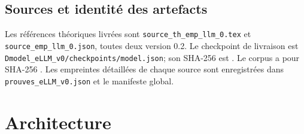 \documentclass[11pt,a4paper]{article}
\begin{document}
\subsection{Sources et identité des artefacts}
Les références théoriques livrées sont \texttt{source\_th\_emp\_llm\_0.tex} et \texttt{source\_emp\_llm\_0.json}, toutes deux version 0.2. Le checkpoint de livraison est \texttt{Dmodel\_eLLM\_v0/checkpoints/model.json}; son SHA-256 est \texttt{}. Le corpus a pour SHA-256 \texttt{}. Les empreintes détaillées de chaque source sont enregistrées dans \texttt{prouves\_eLLM\_v0.json} et le manifeste global.
\section{Architecture}
\end{document}
